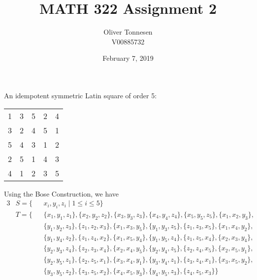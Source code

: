 \documentclass{article}
\title{MATH 322 Assignment 2}
\author{Oliver Tonnesen\\V00885732}
\date{February 7, 2019}
\begin{document}
\maketitle
\renewcommand{\thesubsection}{\thesection.\alph{subsection}}
\section{} %
\subsection{} %
An idempotent symmetric Latin square of order 5:
\newline
\newline
\begin{tabular}{ccccc}
	1 & 3 & 5 & 2 & 4\\
	3 & 2 & 4 & 5 & 1\\
	5 & 4 & 3 & 1 & 2\\
	2 & 5 & 1 & 4 & 3\\
	4 & 1 & 2 & 3 & 5\\
\end{tabular}
\newline
\newline
Using the Bose Construction, we have
\begin{alignat*}{3}
	&S=\{&&x_i,y_i,z_i\;|\;1\le i\le5\}\\
	&T=\{&&\{x_1,y_1,z_1\},
	\{x_2,y_2,z_2\},
	\{x_3,y_3,z_3\},
	\{x_4,y_4,z_4\},
	\{x_5,y_5,z_5\},
	\{x_1,x_2,y_3\},\\
	&&&\{y_1,y_2,z_3\},
	\{z_1,z_2,x_3\},
	\{x_1,x_3,y_5\},
	\{y_1,y_3,z_5\},
	\{z_1,z_3,x_5\},
	\{x_1,x_4,y_2\},\\
	&&&\{y_1,y_4,z_2\},
	\{z_1,z_4,x_2\},
	\{x_1,x_5,y_4\},
	\{y_1,y_5,z_4\},
	\{z_1,z_5,x_4\},
	\{x_2,x_3,y_4\},\\
	&&&\{y_2,y_3,z_4\},
	\{z_2,z_3,x_4\},
	\{x_2,x_4,y_5\},
	\{y_2,y_4,z_5\},
	\{z_2,z_4,x_5\},
	\{x_2,x_5,y_1\},\\
	&&&\{y_2,y_5,z_1\},
	\{z_2,z_5,x_1\},
	\{x_3,x_4,y_1\},
	\{y_3,y_4,z_1\},
	\{z_3,z_4,x_1\},
	\{x_3,x_5,y_2\},\\
	&&&\{y_3,y_5,z_2\},
	\{z_3,z_5,x_2\},
	\{x_4,x_5,y_3\},
	\{y_4,y_5,z_3\},
	\{z_4,z_5,x_3\}
	\}
\end{alignat*}
\end{document}
